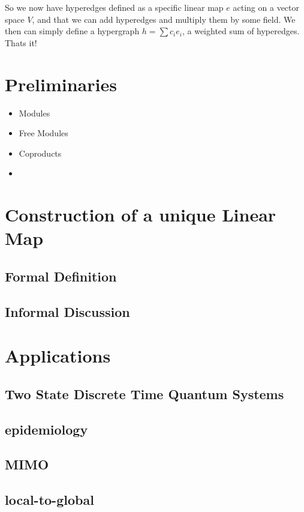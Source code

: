 \documentclass{article}
\begin{document}
So we now have hyperedges defined as a specific linear map $e$ acting on a vector space $V$, and that we can add hyperedges and multiply them by some field. We then can simply define a hypergraph $h = \sum c_i e_i$, a weighted sum of hyperedges. Thats it! 


\section{Preliminaries}
\begin{itemize}
    \item Modules
    \item Free Modules
    \item Coproducts
    \item 
\end{itemize}
\section{Construction of a unique Linear Map}
\subsection{Formal Definition}
\subsection{Informal Discussion}

\section{Applications}
\subsection{Two State Discrete Time Quantum Systems}
\subsection{epidemiology}
\subsection{MIMO}
\subsection{local-to-global}
\end{document}
